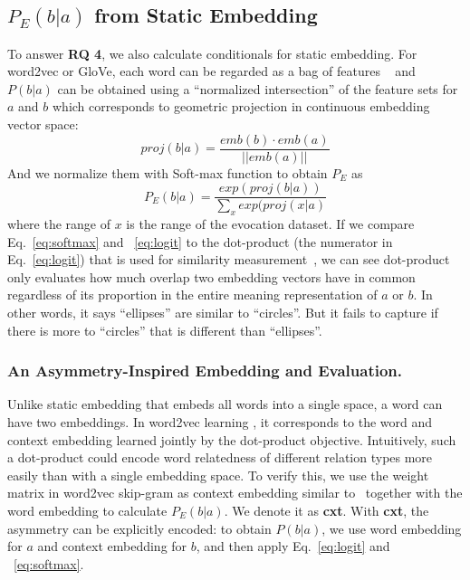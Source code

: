 \documentclass[letterpaper]{article} %
\begin{document}
\subsection{$P_E(b|a)$ from Static Embedding} 
To answer \textbf{RQ 4}, we also calculate conditionals for static embedding. For word2vec or GloVe, each word can be regarded as a bag of features ~\citep{tversky1977features} and $P(b|a)$ can be obtained using a ``normalized intersection'' of the feature sets for $a$ and $b$ which corresponds to geometric projection in continuous embedding vector space:
\begin{equation}
\label{eq:logit}
    proj(b|a) = \frac{emb(b) \cdot emb(a)}{||emb(a)||}
\end{equation}
And we normalize them with Soft-max function to obtain $P_E$ as
\begin{equation}
\label{eq:softmax}
    P_E(b|a) = \frac{exp(proj(b|a))}{\sum_x exp(proj(x|a)}
\end{equation} 
where the range of $x$ is the range of the evocation dataset.
If we compare Eq.~\ref{eq:softmax} and ~\ref{eq:logit} to the dot-product (the numerator in Eq.~\ref{eq:logit}) that is used for similarity measurement~\citep{Levy2014NeuralWE, nematzadeh2017evaluating, arora-etal-2016-latent}, we can see dot-product only evaluates how much overlap two embedding vectors have in common regardless of its proportion in the entire meaning representation of $a$ or $b$. In other words, it says ``ellipses'' are similar to ``circles''. But it fails to capture if there is more to ``circles'' that is different than ``ellipses''.

\subsubsection{An Asymmetry-Inspired Embedding and Evaluation.}
Unlike static embedding that embeds all words into a single space, a word can have two embeddings. In word2vec learning \cite{mikolov2013distributed}, it corresponds to the word and context embedding learned jointly by the dot-product objective. Intuitively, such a dot-product could encode word relatedness of different relation types more easily than with a single embedding space. To verify this, we use the weight matrix in word2vec skip-gram as context embedding similar to~\citep{torabi-asr-etal-2018-querying} together with the word embedding to calculate $P_E(b|a)$. We denote it as \textbf{cxt}. With \textbf{cxt}, the asymmetry can be explicitly encoded: to obtain $P(b|a)$, we use word embedding for $a$ and context embedding for $b$, and then apply Eq.~\ref{eq:logit} and ~\ref{eq:softmax}.
\end{document}
